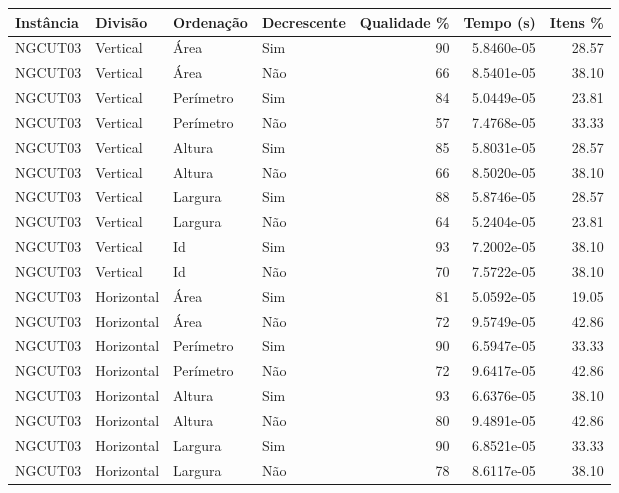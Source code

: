 \begin{tabular}{llllrrr}
    \hline
    Instância & Divisão     & Ordenação & Decrescente & Qualidade \% & Tempo (s)  & Itens \% \\
    \hline
    NGCUT03   & Vertical    & Área      & Sim         & 90           & 5.8460e-05 & 28.57    \\
    NGCUT03   & Vertical    & Área      & Não         & 66           & 8.5401e-05 & 38.10    \\
    NGCUT03   & Vertical    & Perímetro & Sim         & 84           & 5.0449e-05 & 23.81    \\
    NGCUT03   & Vertical    & Perímetro & Não         & 57           & 7.4768e-05 & 33.33    \\
    NGCUT03   & Vertical    & Altura    & Sim         & 85           & 5.8031e-05 & 28.57    \\
    NGCUT03   & Vertical    & Altura    & Não         & 66           & 8.5020e-05 & 38.10    \\
    NGCUT03   & Vertical    & Largura   & Sim         & 88           & 5.8746e-05 & 28.57    \\
    NGCUT03   & Vertical    & Largura   & Não         & 64           & 5.2404e-05 & 23.81    \\
    NGCUT03   & Vertical    & Id        & Sim         & 93           & 7.2002e-05 & 38.10    \\
    NGCUT03   & Vertical    & Id        & Não         & 70           & 7.5722e-05 & 38.10    \\
    NGCUT03   & Horizontal  & Área      & Sim         & 81           & 5.0592e-05 & 19.05    \\
    NGCUT03   & Horizontal  & Área      & Não         & 72           & 9.5749e-05 & 42.86    \\
    NGCUT03   & Horizontal  & Perímetro & Sim         & 90           & 6.5947e-05 & 33.33    \\
    NGCUT03   & Horizontal  & Perímetro & Não         & 72           & 9.6417e-05 & 42.86    \\
    NGCUT03   & Horizontal  & Altura    & Sim         & 93           & 6.6376e-05 & 38.10    \\
    NGCUT03   & Horizontal  & Altura    & Não         & 80           & 9.4891e-05 & 42.86    \\
    NGCUT03   & Horizontal  & Largura   & Sim         & 90           & 6.8521e-05 & 33.33    \\
    NGCUT03   & Horizontal  & Largura   & Não         & 78           & 8.6117e-05 & 38.10    \\

\end{tabular}
